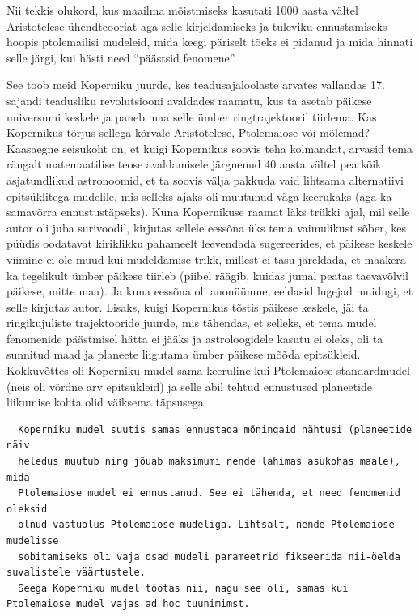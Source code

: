 \documentclass[]{book}
\begin{document}
Nii tekkis olukord, kus maailma mõistmiseks kasutati 1000 aasta vältel
Aristotelese ühendteooriat aga selle kirjeldamiseks ja tuleviku
ennustamiseks hoopis ptolemailisi mudeleid, mida keegi päriselt tõeks ei
pidanud ja mida hinnati selle järgi, kui hästi need ``päästsid
fenomene''.

See toob meid Koperniku juurde, kes teadusajaloolaste arvates vallandas
17. sajandi teadusliku revolutsiooni avaldades raamatu, kus ta asetab
päikese universumi keskele ja paneb maa selle ümber ringtrajektooril
tiirlema. Kas Kopernikus tõrjus sellega kõrvale Aristotelese,
Ptolemaiose või mõlemad? Kaasaegne seisukoht on, et kuigi Kopernikus
soovis teha kolmandat, arvasid tema rängalt matemaatilise teose
avaldamisele järgnenud 40 aasta vältel pea kõik asjatundlikud
astronoomid, et ta soovis välja pakkuda vaid lihtsama alternatiivi
epitsüklitega mudelile, mis selleks ajaks oli muutunud väga keerukaks
(aga ka samavõrra ennustustäpseks). Kuna Kopernikuse raamat läks trükki
ajal, mil selle autor oli juba surivoodil, kirjutas sellele eessõna üks
tema vaimulikust sõber, kes püüdis oodatavat kiriklikku pahameelt
leevendada sugereerides, et päikese keskele viimine ei ole muud kui
mudeldamise trikk, millest ei tasu järeldada, et maakera ka tegelikult
ümber päikese tiirleb (piibel räägib, kuidas jumal peatas taevavõlvil
päikese, mitte maa). Ja kuna eessõna oli anonüümne, eeldasid lugejad
muidugi, et selle kirjutas autor. Lisaks, kuigi Kopernikus tõstis
päikese keskele, jäi ta ringikujuliste trajektooride juurde, mis
tähendas, et selleks, et tema mudel fenomenide päästmisel hätta ei jääks
ja astroloogidele kasutu ei oleks, oli ta sunnitud maad ja planeete
liigutama ümber päikese mõõda epitsükleid. Kokkuvõttes oli Koperniku
mudel sama keeruline kui Ptolemaiose standardmudel (neis oli võrdne arv
epitsükleid) ja selle abil tehtud ennustused planeetide liikumise kohta
olid väiksema täpsusega.

\begin{verbatim}
  Koperniku mudel suutis samas ennustada mõningaid nähtusi (planeetide näiv
  heledus muutub ning jõuab maksimumi nende lähimas asukohas maale), mida
  Ptolemaiose mudel ei ennustanud. See ei tähenda, et need fenomenid oleksid
  olnud vastuolus Ptolemaiose mudeliga. Lihtsalt, nende Ptolemaiose mudelisse
  sobitamiseks oli vaja osad mudeli parameetrid fikseerida nii-öelda suvalistele väärtustele. 
  Seega Koperniku mudel töötas nii, nagu see oli, samas kui Ptolemaiose mudel vajas ad hoc tuunimimst.  
\end{verbatim}
\end{document}
